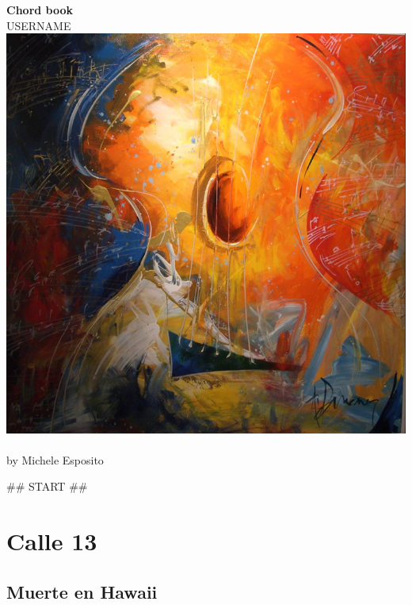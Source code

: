 \documentclass[a4paper]{article}
\begin{document}
\begin{center}
\vspace{3cm}
{\bf{\huge Chord book }}\\
\vspace{2cm}
USERNAME
\vspace{2cm}
\includegraphics[scale=.6]{guitar2.png}\\
\vspace{1cm}
\\
by Michele Esposito \\
\end{center}

\newpage
\tableofcontents
\newpage

## START ##
\section{Calle 13} %
\label{sec:Calle 13}
\subsection{Muerte en Hawaii} %
\label{sub:Muerte en Hawaii}
\end{document}
